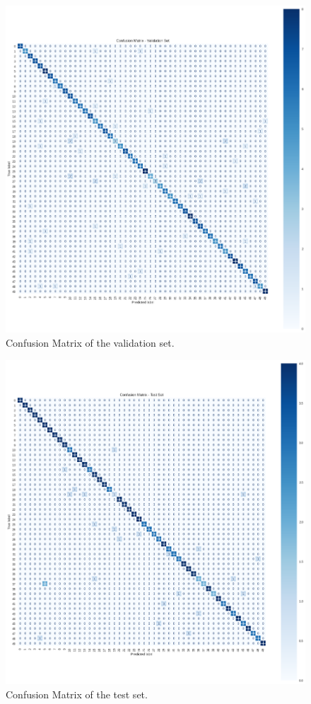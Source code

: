 \documentclass{article}
\begin{document}
\begin{sloppy}
\begin{figure}[ht]
  \centering
  \centerline{\includegraphics[width=\columnwidth]{Confusion_matrix_val.png}}
  \caption{Confusion Matrix of the validation set.}
  \label{fig:confusion_matrix_val}
\end{figure}

\begin{figure}[ht]
  \centering
  \centerline{\includegraphics[width=\columnwidth]{Confusion_matrix_test.png}}
  \caption{Confusion Matrix of the test set.}
  \label{fig:confusion_matrix_test}
\end{figure}



\end{sloppy}
\end{document}
